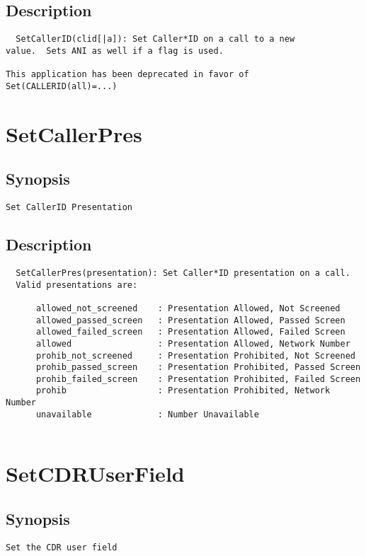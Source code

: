 \subsection{Description}
\begin{verbatim}
  SetCallerID(clid[|a]): Set Caller*ID on a call to a new
value.  Sets ANI as well if a flag is used. 

This application has been deprecated in favor of Set(CALLERID(all)=...)

\end{verbatim}


\section{SetCallerPres}
\subsection{Synopsis}
\begin{verbatim}
Set CallerID Presentation
\end{verbatim}
\subsection{Description}
\begin{verbatim}
  SetCallerPres(presentation): Set Caller*ID presentation on a call.
  Valid presentations are:

      allowed_not_screened    : Presentation Allowed, Not Screened
      allowed_passed_screen   : Presentation Allowed, Passed Screen
      allowed_failed_screen   : Presentation Allowed, Failed Screen
      allowed                 : Presentation Allowed, Network Number
      prohib_not_screened     : Presentation Prohibited, Not Screened
      prohib_passed_screen    : Presentation Prohibited, Passed Screen
      prohib_failed_screen    : Presentation Prohibited, Failed Screen
      prohib                  : Presentation Prohibited, Network Number
      unavailable             : Number Unavailable


\end{verbatim}


\section{SetCDRUserField}
\subsection{Synopsis}
\begin{verbatim}
Set the CDR user field
\end{verbatim}
